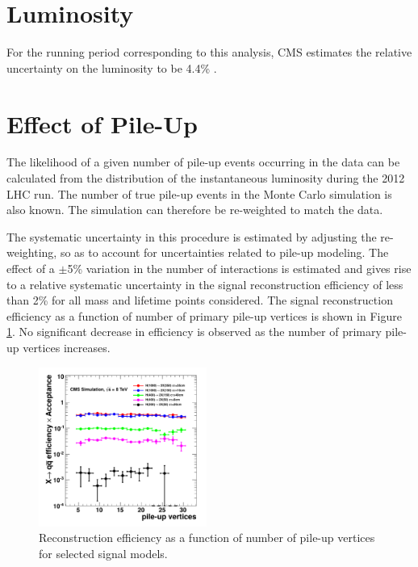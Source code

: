 \section{Luminosity}
For the running period corresponding to this analysis, CMS estimates the relative uncertainty on the luminosity to be 4.4\% \cite{CMS-PAS-LUM-12-001}.

\section{Effect of Pile-Up}
The likelihood of a given number of pile-up events occurring in the data can be calculated from the distribution
 of the instantaneous luminosity during the 2012 LHC run. The number of true pile-up events in the Monte Carlo
 simulation is also known. The simulation can therefore be re-weighted to match the data. 

The systematic uncertainty in this procedure is estimated by adjusting the re-weighting, so as to account
 for uncertainties related to pile-up modeling. 
The effect of a $\pm$5\% variation in the number of interactions is estimated and gives rise 
to a relative systematic uncertainty in the signal reconstruction efficiency 
of less than 2\% for all mass and lifetime points considered. The signal reconstruction efficiency as
a function of number of primary pile-up vertices is shown in Figure \ref{fig:effPU}. No significant
decrease in efficiency is observed as the number of primary pile-up vertices increases.

\begin{figure}[htbp]
\centering
\includegraphics[width=0.49\textwidth]{plots/signal/effPU.pdf}
\caption{Reconstruction efficiency as a function of number of pile-up vertices for selected
signal models.\label{fig:effPU}}
\end{figure}

